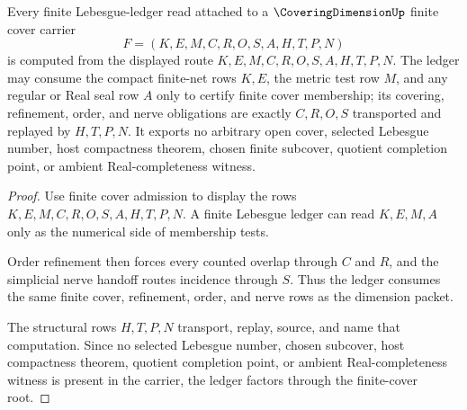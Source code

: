 \begin{theorem}
\label{thm:coveringdimension-finite-cover-root-lebesgue-ledger-route}
Every finite Lebesgue-ledger read attached to a $\CoveringDimensionUp$ finite cover carrier
$$
F=(K,E,M,C,R,O,S,A,H,T,P,N)
$$
is computed from the displayed route $K,E,M,C,R,O,S,A,H,T,P,N$. The ledger may consume the compact finite-net rows $K,E$, the metric test row $M$, and any regular or Real seal row $A$ only to certify finite cover membership; its covering, refinement, order, and nerve obligations are exactly $C,R,O,S$ transported and replayed by $H,T,P,N$. It exports no arbitrary open cover, selected Lebesgue number, host compactness theorem, chosen finite subcover, quotient completion point, or ambient Real-completeness witness.
\end{theorem}
\begin{proof}
Use finite cover admission to display the rows $K,E,M,C,R,O,S,A,H,T,P,N$. A finite Lebesgue ledger can read $K,E,M,A$ only as the numerical side of membership tests.

Order refinement then forces every counted overlap through $C$ and $R$, and the simplicial nerve handoff routes incidence through $S$. Thus the ledger consumes the same finite cover, refinement, order, and nerve rows as the dimension packet.

The structural rows $H,T,P,N$ transport, replay, source, and name that computation. Since no selected Lebesgue number, chosen subcover, host compactness theorem, quotient completion point, or ambient Real-completeness witness is present in the carrier, the ledger factors through the finite-cover root.
\end{proof}

